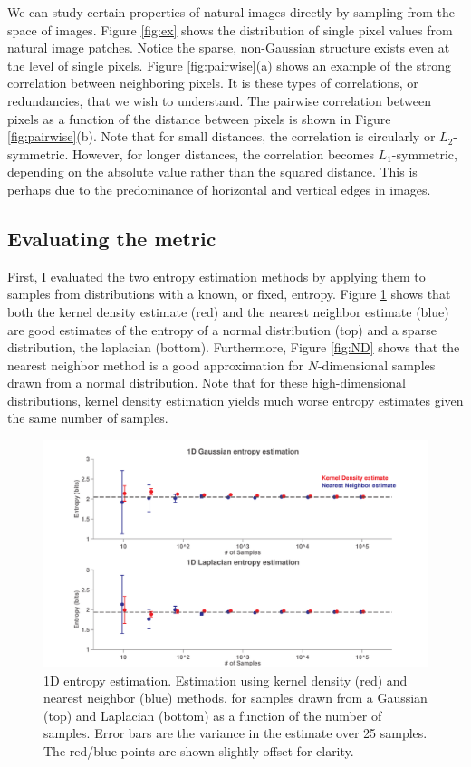 \documentclass[10pt,twocolumn,letterpaper]{article}
\begin{document}
\noindent We can study certain properties of natural images directly by sampling from the space of images. Figure \ref{fig:ex} shows the distribution of single pixel values from natural image patches. Notice the sparse, non-Gaussian structure exists even at the level of single pixels. Figure \ref{fig:pairwise}(a) shows an example of the strong correlation between neighboring pixels. It is these types of correlations, or redundancies, that we wish to understand. The pairwise correlation between pixels as a function of the distance between pixels is shown in Figure \ref{fig:pairwise}(b). Note that for small distances, the correlation is circularly or $L_2$-symmetric. However, for longer distances, the correlation becomes $L_1$-symmetric, depending on the absolute value rather than the squared distance. This is perhaps due to the predominance of horizontal and vertical edges in images.

\subsection{Evaluating the metric}
First, I evaluated the two entropy estimation methods by applying them to samples from distributions with a known, or fixed, entropy. Figure \ref{fig:1D} shows that both the kernel density estimate (red) and the nearest neighbor estimate (blue) are good estimates of the entropy of a normal distribution (top) and a sparse distribution, the laplacian (bottom). Furthermore, Figure \ref{fig:ND} shows that the nearest neighbor method is a good approximation for $N$-dimensional samples drawn from a normal distribution. Note that for these high-dimensional distributions, kernel density estimation yields much worse entropy estimates given the same number of samples.

\begin{figure}[h]
\begin{center}
   \includegraphics[width=0.95\linewidth]{1D.pdf}
   \caption{1D entropy estimation. Estimation using kernel density (red) and nearest neighbor (blue) methods, for samples drawn from a Gaussian (top) and Laplacian (bottom) as a function of the number of samples. Error bars are the variance in the estimate over 25 samples. The red/blue points are shown slightly offset for clarity.}
\label{fig:1D}
\end{center}
\end{figure}
\end{document}
